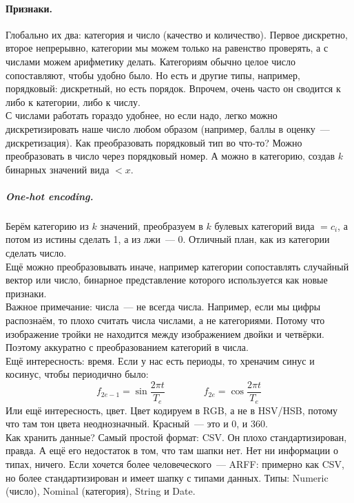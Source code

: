 \documentclass{article}
\begin{document}
    \paragraph{Признаки.}
    Глобально их два: категория и число (качество и количество). Первое дискретно, второе непрерывно, категории мы можем только на равенство проверять, а с числами можем арифметику делать. Категориям обычно целое число сопоставляют, чтобы удобно было. Но есть и другие типы, например, порядковый: дискретный, но есть порядок. Впрочем, очень часто он сводится к либо к категории, либо к числу.\\
    С числами работать гораздо удобнее, но если надо, легко можно дискретизировать наше число любом образом (например, баллы в оценку~--- дискретизация). Как преобразовать порядковый тип во что-то? Можно преобразовать в число через порядковый номер. А можно в категорию, создав $k$ бинарных значений вида ${}<x$.\\
    \subparagraph{One-hot encoding.}
    Берём категорию из $k$ значений, преобразуем в $k$ булевых категорий вида ${}=c_i$, а потом из истины сделать 1, а из лжи~--- 0. Отличный план, как из категории сделать число.\\
    Ещё можно преобразовывать иначе, например категории сопоставлять случайный вектор или число, бинарное представление которого используется как новые признаки.\\
    Важное примечание: числа~--- не всегда числа. Например, если мы цифры распознаём, то плохо считать числа числами, а не категориями. Потому что изображение тройки не находится между изображением двойки и четвёрки. Поэтому аккуратно с преобразованием категорий в числа.\\
    Ещё интересность: время. Если у нас есть периоды, то хреначим синус и косинус, чтобы периодично было:
    \[
    f_{2e-1}=\sin\frac{2\pi t}{T_e}\qquad\qquad f_{2e}=\cos\frac{2\pi t}{T_e}
    \]
    Или ещё интересность, цвет. Цвет кодируем в RGB, а не в HSV/HSB, потому что там тон цвета неоднозначный. Красный~--- это и 0, и 360.\\
    Как хранить данные? Самый простой формат: CSV. Он плохо стандартизирован, правда. А ещё его недостаток в том, что там шапки нет. Нет ни информации о типах, ничего. Если хочется более человеческого~--- ARFF: примерно как CSV, но более стандартизирован и имеет шапку с типами данных. Типы: Numeric (число), Nominal (категория), String и Date.
\end{document}
